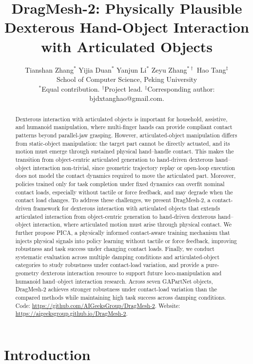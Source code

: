 \documentclass{article}
\title{DragMesh-2: Physically Plausible Dexterous Hand-Object Interaction with Articulated Objects}
\author{
Tianshan Zhang$^{*}$\quad
Yijia Duan$^{*}$\quad
Yanjun Li$^{*}$\quad
Zeyu Zhang$^{*\dag}$\quad
Hao Tang$^{\ddag}$
\\
[0.3em]
School of Computer Science, Peking University\\
[0.1em]
\footnotesize $^*$Equal contribution.
$^\dag$Project lead.
$^\ddag$Corresponding author: bjdxtanghao@gmail.com.
}
\begin{document}
\maketitle


\begin{abstract}
Dexterous interaction with articulated objects is important for household, assistive, and humanoid manipulation, where multi-finger hands can provide compliant contact patterns beyond parallel-jaw grasping. However, articulated-object manipulation differs from static-object manipulation: the target part cannot be directly actuated, and its motion must emerge through sustained physical hand--handle contact. This makes the transition from object-centric articulated generation to hand-driven dexterous hand--object interaction non-trivial, since geometric trajectory replay or open-loop execution does not model the contact dynamics required to move the articulated part. Moreover, policies trained only for task completion under fixed dynamics can overfit nominal contact loads, especially without tactile or force feedback, and may degrade when the contact load changes. To address these challenges, we present DragMesh-2, a contact-driven framework for dexterous interaction with articulated objects that extends articulated interaction from object-centric generation to hand-driven dexterous hand--object interaction, where articulated motion must arise through physical contact. We further propose PICA, a physically informed contact-aware training mechanism that injects physical signals into policy learning without tactile or force feedback, improving robustness and task success under changing contact loads. Finally, we conduct systematic evaluation across multiple damping conditions and articulated-object categories to study robustness under contact-load variation, and provide a pure-geometry dexterous interaction resource to support future loco-manipulation and humanoid hand--object interaction research. Across seven GAPartNet objects, DragMesh-2 achieves stronger robustness under contact-load variation than the compared methods while maintaining high task success across damping conditions.
Code: \url{https://github.com/AIGeeksGroup/DragMesh-2}.
Website: \url{https://aigeeksgroup.github.io/DragMesh-2}. 
\end{abstract}



\section{Introduction}
\end{document}
